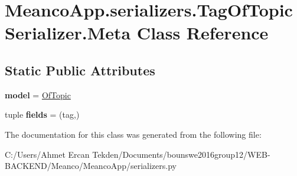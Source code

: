 \hypertarget{class_meanco_app_1_1serializers_1_1_tag_of_topic_serializer_1_1_meta}{}\section{Meanco\+App.\+serializers.\+Tag\+Of\+Topic\+Serializer.\+Meta Class Reference}
\label{class_meanco_app_1_1serializers_1_1_tag_of_topic_serializer_1_1_meta}
\subsection*{Static Public Attributes}
\begin{DoxyCompactItemize}
\item 
\hypertarget{class_meanco_app_1_1serializers_1_1_tag_of_topic_serializer_1_1_meta_ae4dd1082c1de9a66b0429bc866ce8c36}{}\label{class_meanco_app_1_1serializers_1_1_tag_of_topic_serializer_1_1_meta_ae4dd1082c1de9a66b0429bc866ce8c36} 
{\bfseries model} = \hyperlink{class_meanco_app_1_1models_1_1tag_1_1_of_topic}{Of\+Topic}
\item 
\hypertarget{class_meanco_app_1_1serializers_1_1_tag_of_topic_serializer_1_1_meta_a0fb425bec5eeb69ff467b465e215b059}{}\label{class_meanco_app_1_1serializers_1_1_tag_of_topic_serializer_1_1_meta_a0fb425bec5eeb69ff467b465e215b059} 
tuple {\bfseries fields} = (\textquotesingle{}tag\textquotesingle{},)
\end{DoxyCompactItemize}


The documentation for this class was generated from the following file\+:\begin{DoxyCompactItemize}
\item 
C\+:/\+Users/\+Ahmet Ercan Tekden/\+Documents/bounswe2016group12/\+W\+E\+B-\/\+B\+A\+C\+K\+E\+N\+D/\+Meanco/\+Meanco\+App/serializers.\+py\end{DoxyCompactItemize}
